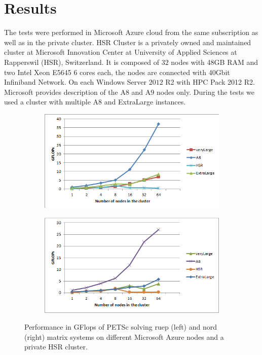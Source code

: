 \documentclass[3p,times]{elsarticle}
\begin{document}
\section{Results}
\label{sec:results}
	
The tests were performed in Microsoft Azure cloud from the same subscription as well as in the private cluster. HSR Cluster is a privately owned and maintained cluster at Microsoft Innovation Center at University of Applied Sciences at Rapperswil (HSR), Switzerland. It is composed of $32$ nodes with 48GB RAM and two Intel Xeon E5645 6 cores each, the nodes are connected with 40Gbit Infiniband Network. On each Windows Server $2012$ R2 with HPC Pack 2012 R2. Microsoft provides description of the A8 and A9 nodes only. During the tests we used a cluster with multiple A8 and ExtraLarge instances.

\begin{figure}
\centering
\begin{subfigure}{.5\textwidth}
  \centering
	\includegraphics[width=\linewidth]{ruppel}  
  \label{fig:ruepel}
\end{subfigure}%
\begin{subfigure}{.5\textwidth}
  \centering
  \includegraphics[width=\linewidth]{nord.png}
  \label{fig:nord}
\end{subfigure}
\caption{Performance in GFlops of PETSc solving ruep (left) and nord (right) matrix systems on different Microsoft Azure nodes and a private HSR cluster. }
\label{fig:test}
\end{figure}
 
\end{document}
